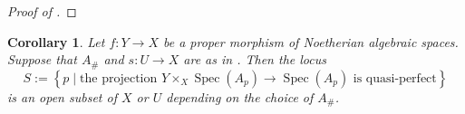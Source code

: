 \documentclass[11pt]{amsart}
\theoremstyle{plain}
\newtheorem{corollary}[theorem]{Corollary}
\theoremstyle{definition}
\numberwithin{equation}{section}
\numberwithin{theorem}{section}
\begin{document}
\begin{proof}[Proof of ]
\end{proof}

\begin{corollary}
    \label{cor:q-perfect_locus}
    Let $f\colon Y\to X$ be a proper morphism of Noetherian algebraic spaces. Suppose that $A_\#$ and $s\colon U\to X$ are as in . Then the locus
    \begin{displaymath}
        S:=\left\{ p \mid \text{the projection } Y\times_X \operatorname{Spec}(A_p)\to \operatorname{Spec}(A_p) \textrm{ is quasi-perfect}\right\}
    \end{displaymath}
    is an open subset of $X$ or $U$ depending on the choice of $A_\#$. 
\end{corollary}
\end{document}
